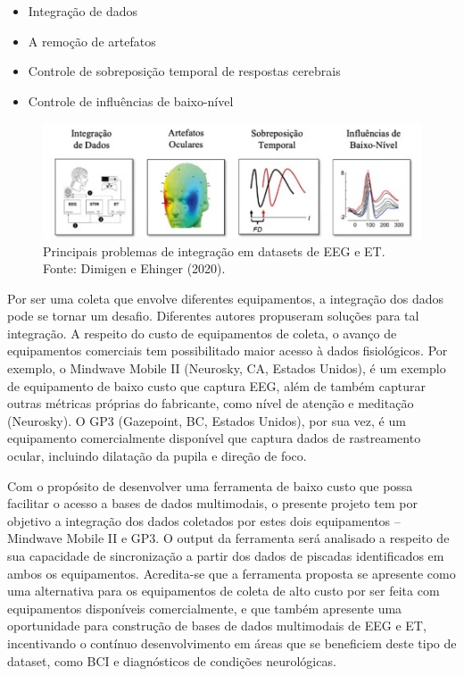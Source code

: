 \documentclass[a4paper, 12pt]{ppgeb}
\begin{document}
\begin{itemize}
    \item Integração de dados
    \item A remoção de artefatos
    \item Controle de sobreposição temporal de respostas cerebrais
    \item Controle de influências de baixo-nível
\end{itemize}

\begin{figure}[h]
    \centering
    \includegraphics[width=130mm]{problemas_eeget.jpg}
    \caption[Exemplo de um acelerador linear utilizado no Hospital Universitário de Brasília.]
    {Principais problemas de integração em datasets de EEG e ET. Fonte: Dimigen e
    Ehinger (2020).}\label{fig:acelerador}
    \end{figure}


Por ser uma coleta que envolve diferentes equipamentos, a integração dos dados pode se tornar um desafio. 
Diferentes autores propuseram soluções para tal integração. A respeito do custo de equipamentos de coleta, o avanço de equipamentos comerciais tem possibilitado maior acesso à dados fisiológicos. Por exemplo, o Mindwave Mobile II (Neurosky, CA, Estados Unidos), é um exemplo de equipamento de baixo custo que captura EEG, além de também capturar outras métricas próprias do fabricante, como nível de atenção e meditação (Neurosky). O GP3 (Gazepoint, BC, Estados Unidos), por sua vez, é um equipamento comercialmente disponível que captura dados de rastreamento ocular, incluindo dilatação da pupila e direção de foco. 


    Com o propósito de desenvolver uma ferramenta de baixo custo que possa facilitar o acesso a bases de dados multimodais, o presente projeto tem por objetivo a integração dos dados coletados por estes dois equipamentos – Mindwave Mobile II e GP3. O output da ferramenta será analisado a respeito de sua capacidade de sincronização a partir dos dados de piscadas identificados em ambos os equipamentos. Acredita-se que a ferramenta proposta se apresente como uma alternativa para os equipamentos de coleta de alto custo por ser feita com equipamentos disponíveis comercialmente, e que também apresente uma oportunidade para construção de bases de dados multimodais de EEG e ET, incentivando o contínuo desenvolvimento em áreas que se beneficiem deste tipo de dataset, como BCI e diagnósticos de condições neurológicas. 
\end{document}
